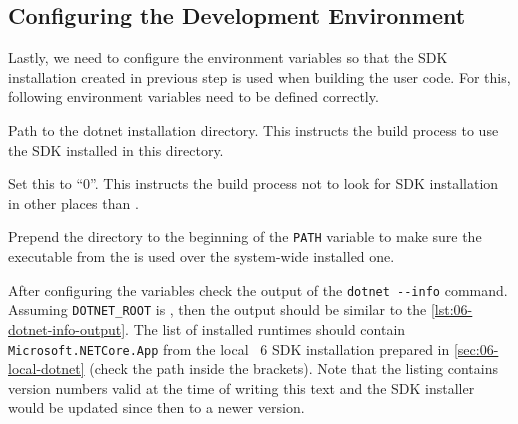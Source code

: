 \subsection{Configuring the Development Environment}\label{sec:06-env-vars}

Lastly, we need to configure the environment variables so that the \dotnet{} SDK installation created in previous step is used when building the user code. For this, following environment variables need to be defined correctly.

\begin{description}

         Path to the dotnet installation directory. This instructs the build process to use the SDK installed in this directory.

         Set this to ``0''. This instructs the build process not to look for SDK installation in other places than .

         Prepend the  directory to the beginning of the \texttt{PATH} variable to make sure the  executable from the  is used over the system-wide installed one.
\end{description}

After configuring the variables check the output of the \verb|dotnet --info| command. Assuming
\texttt{DOTNET_ROOT} is , then the output should be similar to the
\autoref{lst:06-dotnet-info-output}. The list of installed \dotnet{} runtimes should contain
\texttt{Microsoft.NETCore.App} from the local \dotnet{}~6 SDK installation prepared in
\autoref{sec:06-local-dotnet} (check the path inside the brackets). Note that the listing contains
version numbers valid at the time of writing this text and the SDK installer would be updated since
then to a newer version.


